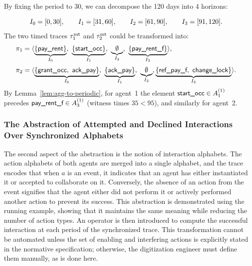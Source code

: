 \documentclass{article}
\begin{document}
  \begin{example}
  \label{ex:agg-30-locked}
  By fixing the period to 30, we can decompose the 120 days into 4 horizons:
  
  \[
  I_{0}=[0,30],\qquad I_{1}=[31,60],\qquad I_{2}=[61,90],\qquad I_{3}=[91,120].
  \]
  The two timed traces $\tau^{\mathrm{mt}}_1$ and $\tau^{\mathrm{mt}}_2$ could be transformed into:
  \[
  \begin{aligned}
  \pi_1&=\trace{%
  \underbrace{\{\textsf{pay\_rent}\}}_{\Ik{0}},\
  \underbrace{\{\textsf{start\_occ}\}}_{\Ik{1}},\
  \underbrace{\emptyset}_{\Ik{2}},\
  \underbrace{\{\textsf{pay\_rent\_f}\}}_{\Ik{3}}},\\[2pt]
  \pi_2&=\trace{%
  \underbrace{\{\textsf{grant\_occ},\ \textsf{ack\_pay}\}}_{\Ik{0}},\
  \underbrace{\{\textsf{ack\_pay}\}}_{\Ik{1}},\
  \underbrace{\emptyset}_{\Ik{2}},
  \underbrace{\{\textsf{ref\_pay\_f},\ \textsf{change\_lock}\}}_{\Ik{3}}}.
  \end{aligned}
  \]
  By Lemma~\ref{lem:agg-to-periodic}, for agent~1 the element $\textsf{start\_occ}\in A^{(1)}_{1}$ precedes
  $\textsf{pay\_rent\_f}\in A^{(1)}_{3}$ (witness times $35<95$), and similarly for agent~2.
  \end{example}
  
  \subsubsection{The Abstraction of Attempted and Declined Interactions Over Synchronized Alphabets}
  The second aspect of the abstraction is the notion of interaction alphabets. The action alphabets of both agents are merged into a single alphabet, and the trace encodes that when $a$ is an event, it indicates that an agent has either instantiated it or accepted to collaborate on it. Conversely, the absence of an action from the event signifies that the agent either did not perform it or actively performed another action to prevent its success. This abstraction is demonstrated using the running example, showing that it maintains the same meaning while reducing the number of action types. An operator is then introduced to compute the successful interaction at each period of the synchronized trace. This transformation cannot be automated unless the set of enabling and interfering actions is explicitly stated in the normative specification; otherwise, the digitization engineer must define them manually, as is done here.
  
\end{document}
